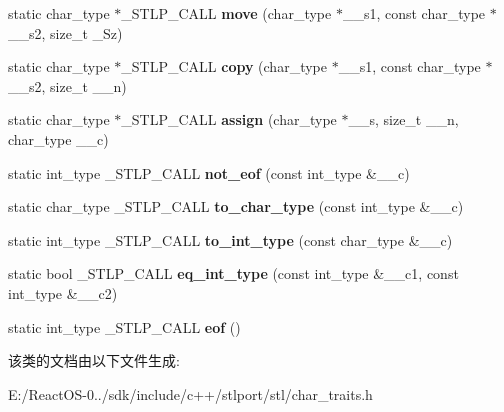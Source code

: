 \begin{DoxyCompactItemize}
static char\+\_\+type $\ast$\+\_\+\+S\+T\+L\+P\+\_\+\+C\+A\+LL {\bfseries move} (char\+\_\+type $\ast$\+\_\+\+\_\+s1, const char\+\_\+type $\ast$\+\_\+\+\_\+s2, size\+\_\+t \+\_\+\+Sz)
\item 
\mbox{\label{class____char__traits__base_ae215de415df973c6b9e6e68c59506a8e}} 
static char\+\_\+type $\ast$\+\_\+\+S\+T\+L\+P\+\_\+\+C\+A\+LL {\bfseries copy} (char\+\_\+type $\ast$\+\_\+\+\_\+s1, const char\+\_\+type $\ast$\+\_\+\+\_\+s2, size\+\_\+t \+\_\+\+\_\+n)
\item 
\mbox{\label{class____char__traits__base_ab646e9920ad47a4dbb6ce7d96a1dc62f}} 
static char\+\_\+type $\ast$\+\_\+\+S\+T\+L\+P\+\_\+\+C\+A\+LL {\bfseries assign} (char\+\_\+type $\ast$\+\_\+\+\_\+s, size\+\_\+t \+\_\+\+\_\+n, char\+\_\+type \+\_\+\+\_\+c)
\item 
\mbox{\label{class____char__traits__base_a2db080810494a07121f511541d57f2dd}} 
static int\+\_\+type \+\_\+\+S\+T\+L\+P\+\_\+\+C\+A\+LL {\bfseries not\+\_\+eof} (const int\+\_\+type \&\+\_\+\+\_\+c)
\item 
\mbox{\label{class____char__traits__base_aa389434f538e08ce4b9913471fec46bc}} 
static char\+\_\+type \+\_\+\+S\+T\+L\+P\+\_\+\+C\+A\+LL {\bfseries to\+\_\+char\+\_\+type} (const int\+\_\+type \&\+\_\+\+\_\+c)
\item 
\mbox{\label{class____char__traits__base_a698f02ad4830ab2fbdaa882011d587a5}} 
static int\+\_\+type \+\_\+\+S\+T\+L\+P\+\_\+\+C\+A\+LL {\bfseries to\+\_\+int\+\_\+type} (const char\+\_\+type \&\+\_\+\+\_\+c)
\item 
\mbox{\label{class____char__traits__base_a34595026f9c9acedef3cfe5405ea0d84}} 
static bool \+\_\+\+S\+T\+L\+P\+\_\+\+C\+A\+LL {\bfseries eq\+\_\+int\+\_\+type} (const int\+\_\+type \&\+\_\+\+\_\+c1, const int\+\_\+type \&\+\_\+\+\_\+c2)
\item 
\mbox{\label{class____char__traits__base_aad56b689c891b4b1526bc6ff54159340}} 
static int\+\_\+type \+\_\+\+S\+T\+L\+P\+\_\+\+C\+A\+LL {\bfseries eof} ()
\end{DoxyCompactItemize}


该类的文档由以下文件生成\+:\begin{DoxyCompactItemize}
\item 
E\+:/\+React\+O\+S-\/0../sdk/include/c++/stlport/stl/char\+\_\+traits.\+h\end{DoxyCompactItemize}
